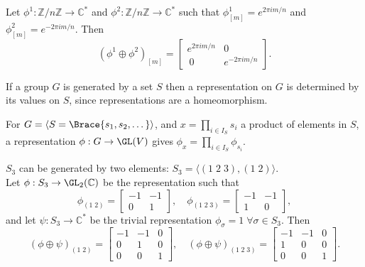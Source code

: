 \begin{exam}
	Let $\phi^1 : \mathbb{Z}/n\mathbb{Z} \to \mathbb{C}^*$ and $\phi^2 : \mathbb{Z}/n\mathbb{Z} \to \mathbb{C}^*$ such that $\phi^1_{[m]} = e^{2\pi i m/n}$ and $\phi^2_{[m]} = e^{-2\pi i m/n}$. Then
	$$(\phi^1 \oplus \phi^2)_{[m]} = \begin{bmatrix}e^{2\pi i m/n} & 0 \\\ 0 & e^{-2 \pi i m/n}\end{bmatrix}.$$
\end{exam}

\begin{lemm}
	If a group $G$ is generated by a set $S$ then a representation on $G$ is determined by its values on $S$, since representations are a homeomorphism.
\end{lemm}
\begin{proo*}
	For $G = \langle S = \Brace{s_1,s_2,\dots} \rangle$, and $x = \prod\limits_{i \in I_S} s_i$ a product of elements in $S$, a representation $\phi : G \to \GL(V)$ gives
	$\phi_x = \prod\limits_{i \in I_S} \phi_{s_i}$.
\end{proo*}

\begin{exam}
	\label{1}
	$S_3$ can be generated by two elements: $S_3 = \langle (1\;2\;3),(1\;2)\rangle.$\\

	Let $\phi : S_3 \to \GL_2(\mathbb{C})$ be the representation such that 
	$$\phi_{(1\;2)} = \begin{bmatrix}-1 & -1\\0 & 1\end{bmatrix},\quad \phi_{(1\;2\;3)} = \begin{bmatrix}-1 & -1\\ 1 & 0\end{bmatrix},$$
	and let $\psi : S_3 \to \mathbb{C}^*$ be the trivial representation $\phi_\sigma = 1\;\forall \sigma \in S_3$. Then
	$$(\phi \oplus \psi)_{(1\;2)} = \begin{bmatrix}-1 & -1 & 0\\ 0 & 1 & 0\\0 & 0 & 1\end{bmatrix},\quad (\phi \oplus \psi)_{(1\;2\;3)} = \begin{bmatrix}-1 & -1 & 0\\1 & 0 & 0\\0 & 0 & 1\end{bmatrix}.$$
\end{exam}

